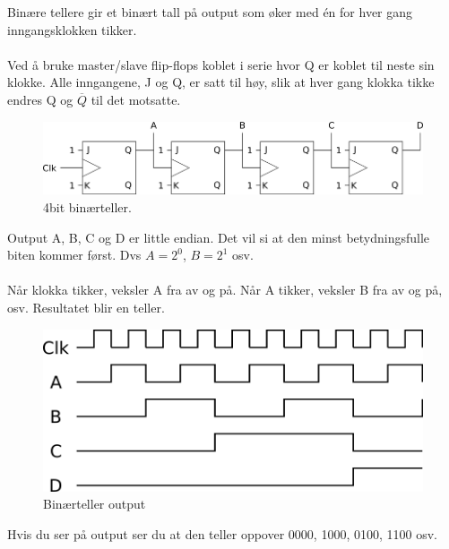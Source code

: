 Binære tellere gir et binært tall på output som øker med én for hver gang
inngangsklokken tikker.
\\\\
Ved å bruke master/slave flip-flops koblet i serie hvor Q er koblet til neste
sin klokke.
Alle inngangene, J og Q, er satt til høy, slik at hver gang klokka tikke endres
Q og $\overline{Q}$ til det motsatte.
\begin{figure}[H]
  \caption{4bit binærteller.}
  \centering
  \includegraphics[width=\textwidth]{./img/biteller}
\end{figure}
Output A, B, C og D er little endian.
Det vil si at den minst betydningsfulle biten kommer først.
Dvs $A=2^0$, $B=2^1$ osv.
\\\\
Når klokka tikker, veksler A fra av og på.
Når A tikker, veksler B fra av og på, osv.
Resultatet blir en teller.
\begin{figure}[H]
  \caption{Binærteller output}
  \centering
  \includegraphics[width=\textwidth]{./img/biteller-output}
\end{figure}
Hvis du ser på output ser du at den teller oppover 0000, 1000, 0100, 1100 osv.
